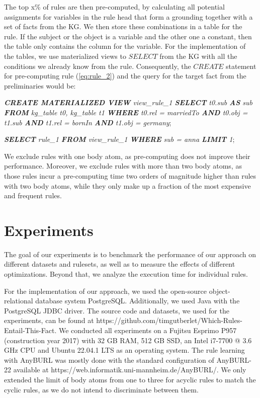 \documentclass[english]{lni}
\begin{document}
The top x\% of rules are then pre-computed, by calculating all potential assignments for variables in the rule head that form a grounding together with a set of facts from the KG. We then store these combinations in a table for the rule. If the subject or the object is a variable and the other one a constant, then the table only contains the column for the variable. For the implementation of the tables, we use materialized views to \(SELECT\) from the KG with all the conditions we already know from the rule. Consequently, the \(CREATE\) statement for pre-computing rule (\ref{eq:rule_2}) and the query for the target fact from the preliminaries would be: 

\textit{\textbf{CREATE MATERIALIZED VIEW} view\_rule\_1 \textbf{SELECT} t0.sub \textbf{AS} sub \textbf{FROM} kg\_table t0,  kg\_table t1 \textbf{WHERE} t0.rel = marriedTo \textbf{AND} t0.obj = t1.sub \textbf{AND} t1.rel = bornIn \textbf{AND} t1.obj = germany};


\textit{\textbf{SELECT} rule\_1 \textbf{FROM} view\_rule\_1  \textbf{WHERE} sub = anna \textbf{LIMIT} 1};

We exclude rules with one body atom, as pre-computing does not improve their performance. Moreover, we exclude rules with more than two body atoms, as those rules incur a pre-computing time two orders of magnitude higher than rules with two body atoms, while they only make up a fraction of the most expensive and frequent rules.

\section{Experiments}
The goal of our experiments is to benchmark the performance of our approach on different datasets and rulesets, as well as to measure the effects of different optimizations. Beyond that, we analyze the execution time for individual rules.

For the implementation of our approach, we used the open-source object-relational database system PostgreSQL. Additionally, we used Java with the PostgreSQL JDBC driver. The source code and datasets, we used for the experiments, can be found at https://github.com/timgutberlet/Which-Rules-Entail-This-Fact. We conducted all experiments on a Fujitsu Esprimo P957 (construction year 2017) with 32 GB RAM, 512 GB SSD, an Intel i7-7700 @ 3.6 GHz CPU and Ubuntu 22.04.1 LTS as an operating system. The rule learning with AnyBURL was mostly done with the standard configuration of AnyBURL-22 available at https://web.informatik.uni-mannheim.de/AnyBURL/. We only extended the limit of body atoms from one to three for acyclic rules to match the cyclic rules, as we do not intend to discriminate between them.
\end{document}
